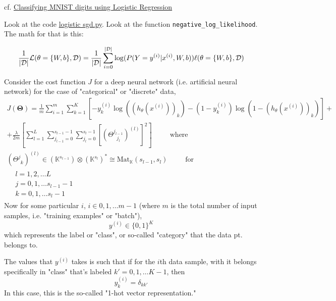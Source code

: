 \documentclass[10pt]{amsart}
\begin{document}
\begin{multicols*}{2}
cf. \href{http://deeplearning.net/tutorial/logreg.html}{Classifying MNIST digits using Logistic Regression}  

Look at the code \href{http://deeplearning.net/tutorial/code/logistic_sgd.py}{logistic sgd.py}.  Look at the function \verb|negative_log_likelihood|.  The math for that is this:

\begin{equation}
            \frac{1}{|\mathcal{D}|} \mathcal{L} (\theta=\{W,b\}, \mathcal{D}) =
            \frac{1}{|\mathcal{D}|} \sum_{i=0}^{|\mathcal{D}|}
                \log(P(Y=y^{(i)}|x^{(i)}, W,b)) \\
            \ell (\theta=\{W,b\}, \mathcal{D})
\end{equation}

Consider the cost function $J$ for a deep neural network (i.e. artificial neural network) for the case of "categorical" or "discrete" data, 
\begin{equation}
\begin{gathered}
	J(\mathbf{\Theta}) = \frac{1}{m} \sum_{i=1}^m \sum_{k=1}^K \left[ -y_k^{(i)} \log{ ((h_{\theta}(x^{(i)} ) )_k ) } - (1-y_k^{(i)} ) \log{ (1- (h_{\theta}(x^{(i)} ) )_k ) } \right] + \\
+ \frac{\lambda}{2m} \left[  \sum_{l=1}^L \sum_{j_{l-1}=0}^{s_{l-1}-1} \sum_{ j_l=0}^{ s_l-1} \left[  ( \Theta^{j_{l-1}}_{ \  \  \  j_l} )^{(l)}   \right]^2 \right] \qquad \, \text{ where } \\
(\Theta^j_{ \  \  k} )^{(l)}  \in (\mathbb{K}^{ s_{l-1}} ) \otimes ( \mathbb{K}^{s_l} )^* \cong \text{Mat}_{\mathbb{K}}(s_{l-1},s_l)  \qquad \, \text { for } \\
\begin{aligned}
	& l=1,2,\dots L \\ 
& j = 0,1,\dots s_{l-1} - 1 \\ 
& k = 0,1,\dots s_l - 1 
\end{aligned}
\end{gathered}
\end{equation}
Now for some particular $i$, $i\in 0,1,\dots m-1$ (where $m$ is the total number of input samples, i.e. "training examples" or "batch"), 
\[
y^{(i)} \in \lbrace 0 ,1 \rbrace^K 
\]
which represents the label or "class", or so-called "category" that the data pt. belongs to.  

The values that $y^{(i)}$ takes is such that if for the $i$th data sample, with it belongs specifically in "class" that's labeled $k'=0,1,\dots K-1$, then 
\[
y^{(i)}_k = \delta_{kk'}
\]
In this case, this is the so-called "1-hot vector representation."  


\end{multicols*}
\end{document}
